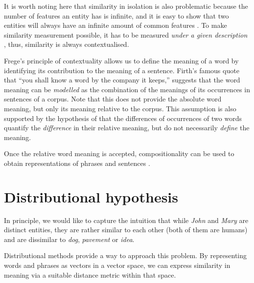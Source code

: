 It is worth noting here that similarity in isolation is also problematic because the number of features an entity has is infinite, and it is easy to show that two entities will always have an infinite amount of common features \cite{goodman1972problems,hahn1997concepts}. To make similarity measurement possible, it has to be measured \emph{under a given description} \cite{WCS:WCS1282,medin1993respects,Markman1996}, thus, similarity is always contextualised.

Frege's principle of contextuality allows us to define the meaning of a word by identifying its contribution to the meaning of a sentence. Firth's \citeyearpar{firth1957lingtheory} famous quote that ``you shall know a word by the company it keeps,'' suggests that the word meaning can be \emph{modelled} as the combination of the meanings of its occurrences in sentences of a corpus. Note that this does not provide the absolute word meaning, but only its meaning relative to the corpus. This assumption is also supported by the hypothesis of  that the differences of occurrences of two words quantify the \emph{difference} in their relative meaning, but do not necessarily \emph{define} the meaning.

Once the relative word meaning is accepted, compositionality can be used to obtain representations of phrases and sentences \cite{THEO:THEO373,Dowty1980,sep-montague-semantics,DBLP:journals/corr/abs-1003-4394,baroni2014frege}.

\section{Distributional hypothesis}
\label{sec:distr-hypoth}

In principle, we would like to capture the intuition that while \textit{John} and \textit{Mary} are distinct entities, they are rather similar to each other (both of them are humans) and are dissimilar to \textit{dog}, \textit{pavement} or \textit{idea}.


Distributional methods provide a way to approach this problem. By representing words and phrases as vectors in a vector space, we can express similarity in meaning via a suitable distance metric within that space.

